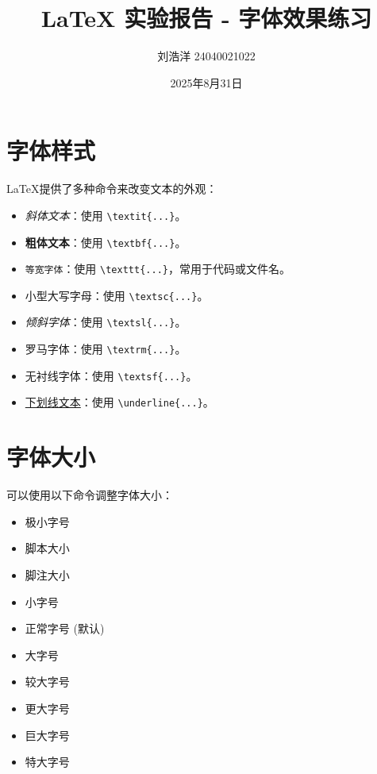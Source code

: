 \documentclass{article}
\title{LaTeX 实验报告 - 字体效果练习}
\author{刘浩洋 24040021022}
\date{2025年8月31日}
\begin{document}
\maketitle

\section{字体样式}
LaTeX提供了多种命令来改变文本的外观：
\begin{itemize}
    \item \textit{斜体文本}：使用 \texttt{\textbackslash textit\{...\}}。
    \item \textbf{粗体文本}：使用 \texttt{\textbackslash textbf\{...\}}。
    \item \texttt{等宽字体}：使用 \texttt{\textbackslash texttt\{...\}}，常用于代码或文件名。
    \item \textsc{小型大写字母}：使用 \texttt{\textbackslash textsc\{...\}}。
    \item \textsl{倾斜字体}：使用 \texttt{\textbackslash textsl\{...\}}。
    \item \textrm{罗马字体}：使用 \texttt{\textbackslash textrm\{...\}}。
    \item \textsf{无衬线字体}：使用 \texttt{\textbackslash textsf\{...\}}。
    \item \underline{下划线文本}：使用 \texttt{\textbackslash underline\{...\}}。
\end{itemize}

\section{字体大小}
可以使用以下命令调整字体大小：
\begin{itemize}
    \item {\tiny 极小字号}
    \item {\scriptsize 脚本大小}
    \item {\footnotesize 脚注大小}
    \item {\small 小字号}
    \item {\normalsize 正常字号} (默认)
    \item {\large 大字号}
    \item {\Large 较大字号}
    \item {\LARGE 更大字号}
    \item {\huge 巨大字号}
    \item {\Huge 特大字号}
\end{itemize}
\end{document}
